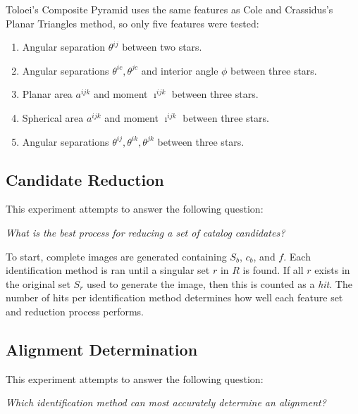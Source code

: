 Toloei's Composite Pyramid uses the same features as Cole and Crassidus's Planar Triangles method, so only five
features were tested:
\begin{enumerate}
    \item Angular separation $\theta^{ij}$ between two stars.
    \item Angular separations $\theta^{ic}, \theta^{jc}$ and interior angle $\phi$ between three stars.
    \item Planar area $a^{ijk}$ and moment $\imath^{ijk}$ between three stars.
    \item Spherical area $a^{ijk}$ and moment $\imath^{ijk}$ between three stars.
    \item Angular separations $\theta^{ij}, \theta^{ik}, \theta^{jk}$ between three stars.
\end{enumerate}

\subsection{Candidate Reduction}\label{subsec:candidateReductionMethods}
This experiment attempts to answer the following question:
\begin{displayquote}
    \textit{What is the best process for reducing a set of catalog candidates?}
\end{displayquote}

To start, complete images are generated containing $S_b$, $c_b$, and $f$.
Each identification method is ran until a singular set $r$ in $R$ is found.
If all $r$ exists in the original set $S_r$ used to generate the image, then this is counted as a \textit{hit}.
The number of hits per identification method determines how well each feature set and reduction process performs.

\subsection{Alignment Determination}\label{subsec:alignmentDeterminationMethods}
This experiment attempts to answer the following question:
\begin{displayquote}
    \textit{Which identification method can most accurately determine an alignment?}
\end{displayquote}